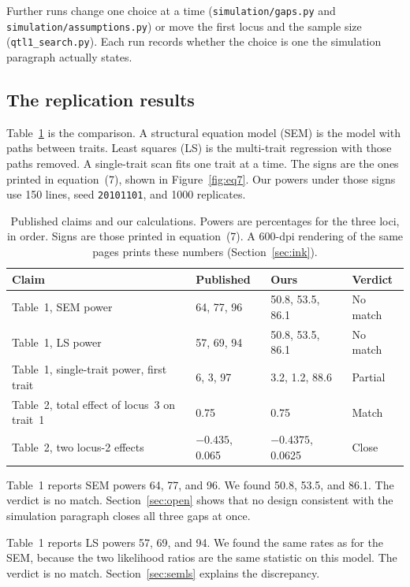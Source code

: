 \documentclass[11pt]{article}
\begin{document}
Further runs change one choice at a time (\texttt{simulation/gaps.py} and
\texttt{simulation/assumptions.py}) or move the first locus and the sample
size (\texttt{qtl1\_search.py}). Each run records whether the choice is one
the simulation paragraph actually states.

\subsection{The replication results}
\label{sec:results-short}

Table~\ref{tab:compare} is the comparison. A structural equation model (SEM)
is the model with paths between traits. Least squares (LS) is the
multi-trait regression with those paths removed. A single-trait scan fits
one trait at a time. The signs are the ones printed in equation~(7),
shown in Figure~\ref{fig:eq7}. Our powers under those signs use 150 lines,
seed \texttt{20101101}, and 1000 replicates.

\begin{table}[ht]
\centering
\caption{Published claims and our calculations. Powers are percentages for
the three loci, in order. Signs are those printed in equation~(7).
A 600-dpi rendering of the same pages prints these numbers
(Section~\ref{sec:ink}).}
\label{tab:compare}
\small
\begin{tabular}{@{}p{}p{}p{}p{}@{}}
\toprule
Claim & Published & Ours & Verdict \\
\midrule
Table~1, SEM power & 64, 77, 96 & 50.8, 53.5, 86.1 & No match \\
Table~1, LS power & 57, 69, 94 & 50.8, 53.5, 86.1 & No match \\
Table~1, single-trait power, first trait & 6, 3, 97 & 3.2, 1.2, 88.6 & Partial \\
Table~2, total effect of locus~3 on trait~1 & 0.75 & 0.75 & Match \\
Table~2, two locus-2 effects & $-0.435$, 0.065 & $-0.4375$, 0.0625 & Close \\
\bottomrule
\end{tabular}
\end{table}

Table~1 reports SEM powers 64, 77, and 96. We found 50.8, 53.5, and 86.1.
The verdict is no match. Section~\ref{sec:open} shows that no design
consistent with the simulation paragraph closes all three gaps at once.

Table~1 reports LS powers 57, 69, and 94. We found the same rates as for the
SEM, because the two likelihood ratios are the same statistic on this model.
The verdict is no match. Section~\ref{sec:semls} explains the discrepancy.
\end{document}
